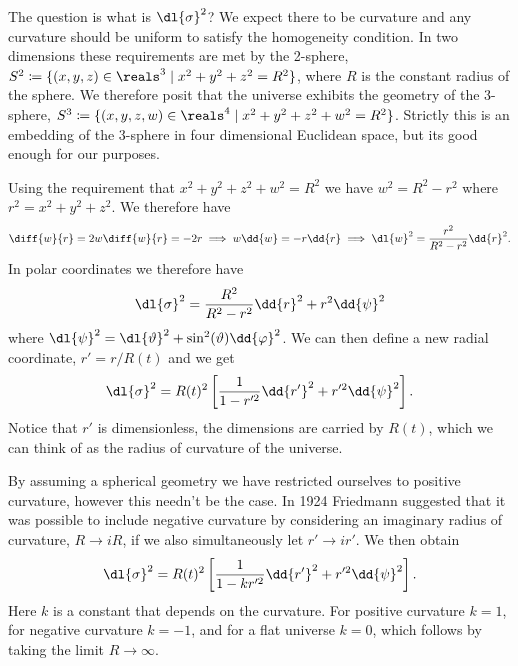 \documentclass[fleqn]{NotesClass}
\begin{document}
    The question is what is \(\dl{\sigma}^2\)?
    We expect there to be curvature and any curvature should be uniform to satisfy the homogeneity condition.
    In two dimensions these requirements are met by the 2-sphere, \(S^2 \coloneqq \{(x, y, z) \in \reals^3 \mid x^2 + y^2 + z^2 = R^2\}\), where \(R\) is the constant radius of the sphere.
    We therefore posit that the universe exhibits the geometry of the 3-sphere, \(S^3 \coloneqq \{(x, y, z, w) \in \reals^4 \mid x^2 + y^2 + z^2 + w^2 = R^2\}\).
    Strictly this is an embedding of the 3-sphere in four dimensional Euclidean space, but its good enough for our purposes.
    
    Using the requirement that \(x^2 + y^2 + z^2 + w^2 = R^2\) we have \(w^2 = R^2 - r^2\) where \(r^2 = x^2 + y^2 + z^2\).
    We therefore have
    \begin{equation}
        \diff{w}{r} = 2w\diff{w}{r} = -2r \implies w\dd{w} = -r\dd{r} \implies \dl{w}^2 = \frac{r^2}{R^2 - r^2}\dd{r}^2.
    \end{equation}
    In polar coordinates we therefore have
    \begin{equation}
        \dl{\sigma}^2 = \frac{R^2}{R^2 - r^2} \dd{r}^2 + r^2\dd{\psi}^2
    \end{equation}
    where \(\dl{\psi}^2 = \dl{\vartheta}^2 + \sin^2(\vartheta) \dd{\varphi}^2\).
    We can then define a new radial coordinate, \(r' = r/R(t)\) and we get
    \begin{equation}
        \dl{\sigma}^2 = R(t)^2\left[ \frac{1}{1 - r'^2}\dd{r'}^2 + r'^2\dd{\psi}^2 \right].
    \end{equation}
    Notice that \(r'\) is dimensionless, the dimensions are carried by \(R(t)\), which we can think of as the radius of curvature of the universe.
    
    By assuming a spherical geometry we have restricted ourselves to positive curvature, however this needn't be the case.
    In 1924 Friedmann suggested that it was possible to include negative curvature by considering an imaginary radius of curvature, \(R \to iR\), if we also simultaneously let \(r' \to ir'\).
    We then obtain
    \begin{equation}
        \dl{\sigma}^2 = R(t)^2\left[ \frac{1}{1 - kr'^2}\dd{r'}^2 + r'^2\dd{\psi}^2 \right].
    \end{equation}
    Here \(k\) is a constant that depends on the curvature.
    For positive curvature \(k = 1\), for negative curvature \(k = -1\), and for a flat universe \(k = 0\), which follows by taking the limit \(R \to \infty\).
    
\end{document}
